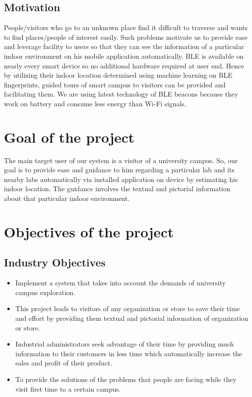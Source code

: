 \documentclass{article}
\begin{document}
\subsection{Motivation}
People/visitors who go to an unknown place find it difficult to traverse and wants to find places/people of interest easily. Such problems motivate us to provide ease and leverage facility to users so that they can see the information of a particular indoor environment on his mobile application automatically. BLE is available on nearly every smart device so no additional hardware required at user end. Hence by utilizing their indoor location determined using machine learning on BLE fingerprints, guided tours of smart campus to visitors can be provided and facilitating them. We are using latest technology of BLE beacons because they work on battery and consume less energy than Wi-Fi signals\cite{hultgren2015evaluating}.
\section{Goal of the project}
The main target user of our system is a visitor of a university campus. So, our goal is to provide ease and guidance to him regarding a particular lab and its nearby labs automatically via installed application on device by estimating his indoor location. The guidance involves the textual and pictorial information about that particular indoor environment.
\section{Objectives of the project}
\subsection{Industry Objectives}
\begin{itemize}
\item Implement a system that takes into account the demands of university campus exploration.
\item This project leads to visitors of any organization or store to save their time and effort by providing them textual and pictorial information of organization or store.
\item Industrial administrators seek advantage of their time by providing much information to their customers in less time which automatically increase the sales and profit of their product.
\item To provide the solutions of the problems that people are facing while they visit first time to a certain campus.


\end{itemize}
\end{document}
